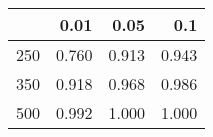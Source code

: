 % 
\begin{tabular}{rrrr}
  \hline
 & 0.01 & 0.05 & 0.1 \\ 
  \hline
250 & 0.760 & 0.913 & 0.943 \\ 
  350 & 0.918 & 0.968 & 0.986 \\ 
  500 & 0.992 & 1.000 & 1.000 \\ 
   \hline
\end{tabular}
